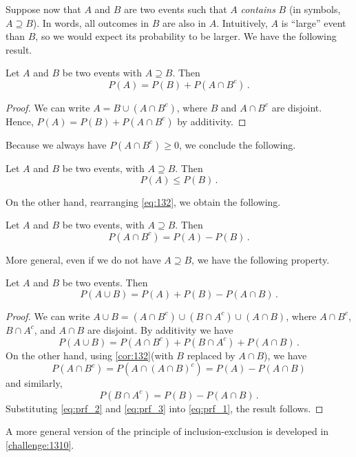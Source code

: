 Suppose now that $A$ and $B$ are two events such that $A$ \emph{contains} $B$ (in symbols, $A \supseteq B$).
In words, all outcomes in $B$ are also in $A$. Intuitively, $A$ is ``large'' event than $B$, so we would expect its
probability to be larger.
We have the following result.
\begin{theorem}
    Let $A$ and $B$ be two events with $A \supseteq B$. Then
    \begin{equation}
        \label{eq:132}
        P(A) = P(B)+P(A \cap B^c)\,.
    \end{equation}
\end{theorem}
\begin{proof}
    We can write $A=B\cup (A \cap B^c)$, where $B$ and $A \cap B^c$ are disjoint. Hence, $P(A)=P(B)+P(A\cap B^c)$ by
    additivity.
\end{proof}
Because we always have $P(A \cap B^c)\geqslant 0$, we conclude the following.
\begin{corollary}
    Let $A$ and $B$ be two events, with $ A \supseteq B$. Then
    $$
    P(A) \leqslant P(B)\,.
    $$
\end{corollary}
On the other hand, rearranging \autoref{eq:132}, we obtain the following.
\begin{corollary}\label{cor:132}
    Let $A$ and $B$ be two events, with $A \supseteq B$. Then
    \begin{equation}
        P(A \cap B^c) = P(A) - P(B)\,.
    \end{equation}
\end{corollary}

More general, even if we do not have $A \supseteq B$, we have the following property.

\begin{theorem}
    Let $A$ and $B$ be two events. Then
    \begin{equation}
        P(A \cup B) = P(A) + P(B) - P(A \cap B)\,.
    \end{equation}
\end{theorem}
\begin{proof}
    We can write $A\cup B = (A \cap B^c) \cup (B \cap A^c) \cup (A \cap B)$, where  $A\cap B^c$, $B \cap A^c$, and
    $A\cap B$ are disjoint. By additivity we have
    \begin{equation}\label{eq:prf_1}
        P(A\cup B) = P(A\cap B^c) + P(B \cap A^c)+P(A \cap B)\,.
    \end{equation}
    On the other hand, using \autoref{cor:132}(with $B$ replaced by $A \cap B$), we have
    \begin{equation}\label{eq:prf_2}
        P(A \cap B^c) = P(A \cap (A \cap B)^c) = P(A) - P(A \cap B)
    \end{equation}
    and similarly,
    \begin{equation}\label{eq:prf_3}
        P(B \cap A^c) = P(B) - P(A \cap B)\,.
    \end{equation}
    Substituting \autoref{eq:prf_2} and \autoref{eq:prf_3} into \autoref{eq:prf_1}, the result follows.
\end{proof}
A more general version of the principle of inclusion-exclusion is developed in \autoref{challenge:1310}.

